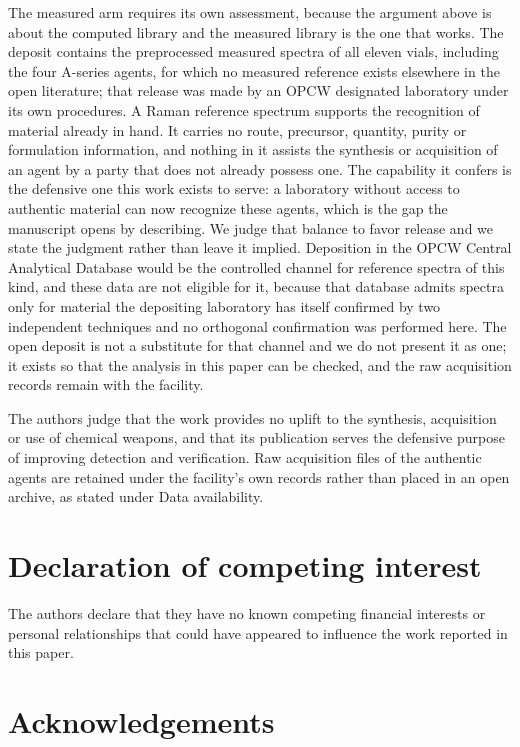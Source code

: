 \documentclass[review,12pt]{elsarticle}
\begin{document}
The measured arm requires its own assessment, because the argument above is about the
computed library and the measured library is the one that works. The deposit contains the
preprocessed measured spectra of all eleven vials, including the four A-series agents, for
which no measured reference exists elsewhere in the open literature; that release was made
by an OPCW designated laboratory under its own procedures. A Raman reference spectrum
supports the recognition of material already in hand. It carries no route, precursor,
quantity, purity or formulation information, and nothing in it assists the synthesis or
acquisition of an agent by a party that does not already possess one. The capability it
confers is the defensive one this work exists to serve: a laboratory without access to
authentic material can now recognize these agents, which is the gap the manuscript opens
by describing. We judge that balance to favor release and we state the judgment rather
than leave it implied. Deposition in the OPCW Central Analytical Database would be the
controlled channel for reference spectra of this kind, and these data are not eligible for
it, because that database admits spectra only for material the depositing laboratory has
itself confirmed by two independent techniques and no orthogonal confirmation was
performed here. The open deposit is not a substitute for that channel and we do not
present it as one; it exists so that the analysis in this paper can be checked, and the
raw acquisition records remain with the facility.

The authors judge that the work provides no uplift to the synthesis,
acquisition or use of chemical weapons, and that its publication serves the defensive
purpose of improving detection and verification. Raw acquisition files of the authentic
agents are retained under the facility's own records rather than placed in an open archive,
as stated under Data availability.

\section*{Declaration of competing interest}

The authors declare that they have no known competing financial interests or personal
relationships that could have appeared to influence the work reported in this paper.

\section*{Acknowledgements}
\end{document}
